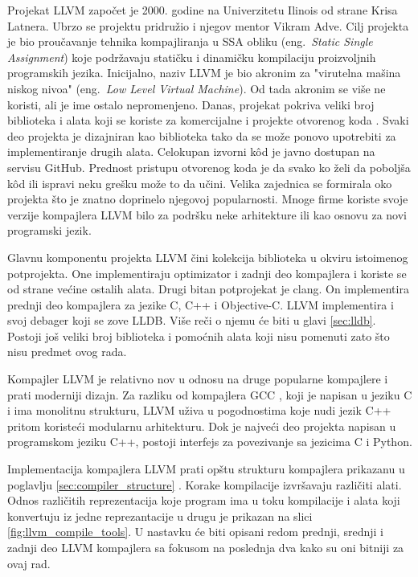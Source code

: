 \documentclass[12pt,oneside]{memoir}
\begin{document}
Projekat LLVM započet je 2000. godine na Univerzitetu Ilinois od strane Krisa Latnera. Ubrzo se projektu pridružio i njegov mentor Vikram Adve.
Cilj projekta je bio proučavanje tehnika kompajliranja u SSA obliku (eng.~{\em Static Single Assignment}) koje podržavaju statičku i dinamičku kompilaciju proizvoljnih programskih jezika.
Inicijalno, naziv LLVM je bio akronim za "virutelna mašina niskog nivoa" (eng.~{\em Low Level Virtual Machine}).
Od tada akronim se više ne koristi, ali je ime ostalo nepromenjeno.
Danas, projekat pokriva veliki broj biblioteka i alata koji se koriste za komercijalne i projekte otvorenog koda \cite{llvm}.
Svaki deo projekta je dizajniran kao biblioteka tako da se može ponovo upotrebiti za implementiranje drugih alata.
Celokupan izvorni k\^od je javno dostupan na servisu GitHub. %
Prednost pristupu otvorenog koda je da svako ko želi da poboljša k\^od ili ispravi neku grešku može to da učini.
Velika zajednica se formirala oko projekta što je znatno doprinelo njegovoj popularnosti.
Mnoge firme koriste svoje verzije kompajlera LLVM bilo za podršku neke arhitekture ili kao osnovu za novi programski jezik. %

Glavnu komponentu projekta LLVM čini kolekcija biblioteka u okviru istoimenog potprojekta.
One implementiraju optimizator i zadnji deo kompajlera i koriste se od strane većine ostalih alata.
Drugi bitan potprojekat je clang. On implementira prednji deo kompajlera za jezike C, C++ i Objective-C.
LLVM implementira i svoj debager koji se zove LLDB. Više reči o njemu će biti u glavi \ref{sec:lldb}.
Postoji još veliki broj biblioteka i pomoćnih alata koji nisu pomenuti zato što nisu predmet ovog rada.

Kompajler LLVM je relativno nov u odnosu na druge popularne kompajlere i prati moderniji dizajn.
Za razliku od kompajlera GCC \cite{gcc}, koji je napisan u jeziku C i ima monolitnu strukturu, LLVM uživa u pogodnostima koje nudi jezik C++ pritom koristeći modularnu arhitekturu.
Dok je najveći deo projekta napisan u programskom jeziku C++, postoji interfejs za povezivanje sa jezicima C i Python.

Implementacija kompajlera LLVM prati opštu strukturu kompajlera prikazanu u poglavlju \ref{sec:compiler_structure} \cite{brown2011architecture}.
Korake kompilacije izvršavaju različiti alati.
Odnos različitih reprezentacija koje program ima u toku kompilacije i alata koji konvertuju iz jedne reprezantacije u drugu je prikazan na slici \ref{fig:llvm_compile_tools}.
U nastavku će biti opisani redom prednji, srednji i zadnji deo LLVM kompajlera sa fokusom na poslednja dva kako su oni bitniji za ovaj rad.
\end{document}

